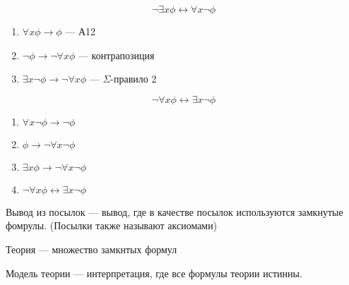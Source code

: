 \begin{example}
    $$\neg \exists x \phi \leftrightarrow \forall x \neg \phi$$
    \begin{enumerate}
        \item $\forall x \phi \rightarrow \phi$ --- А12
        \item $\neg \phi \rightarrow \neg \forall x \phi$ --- контрапозиция
        \item $\exists x \neg \phi \rightarrow \neg \forall x \phi$ --- $\Sigma$-правило 2
    \end{enumerate}
\end{example}

\begin{example}
    $$\neg \forall x \phi \leftrightarrow \exists x \neg \phi$$
    \begin{enumerate}
        \item $\forall x \neg \phi \rightarrow \neg \phi$
        \item $\phi \rightarrow \neg\forall x \neg\phi$
        \item $\exists x \phi \rightarrow \neg \forall x \neg \phi$
        \item $\neg \forall x \phi \leftrightarrow \exists x \neg \phi$
    \end{enumerate}
\end{example}

\begin{definition}
    Вывод из посылок --- вывод, где в качестве посылок используются замкнутые фомрулы. (Посылки также называют аксиомами)
\end{definition}

\begin{definition}
    Теория --- множество замкнтых формул
\end{definition}

\begin{definition}
    Модель теории --- интерпретация, где все формулы теории истинны.
\end{definition}

